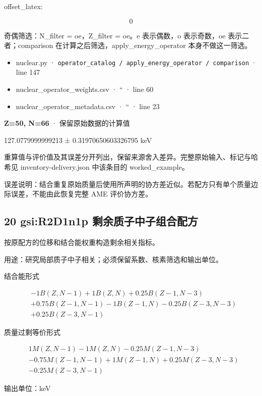 \documentclass[
  11pt,
  letterpaper,
]{article}
\providecommand{\tightlist}{%
  \setlength{\itemsep}{0pt}\setlength{\parskip}{0pt}}
\begin{document}
offset\_latex:

\[
0
\]

奇偶筛选：N\_filter = oe，Z\_filter = oe。e 表示偶数，o 表示奇数，oe
表示二者；comparison 在计算之后筛选，apply\_energy\_operator
本身不做这一筛选。

\begin{itemize}
\tightlist
\item
  nuclear.py ·
  \texttt{operator\_catalog\ /\ apply\_energy\_operator\ /\ comparison}
  · line 147
\item
  nuclear\_operator\_weights.csv · `` · line 60
\item
  nuclear\_operator\_metadata.csv · `` · line 23
\end{itemize}

\textbf{Z=50, N=66} · 保留原始数据的计算值

127.0779999999213 ± 0.31970650603326795 keV

重算值与评价值及其误差分开列出，保留来源舍入差异。完整原始输入、标记与哈希见
inventory-delivery.json 中该条目的 worked\_example。

误差说明：结合重复原始质量后使用所声明的协方差近似。若配方只有单个质量边际误差，不能由此恢复完整
AME 评价协方差。

\subsection{20 gsi:R2D1n1p
剩余质子中子组合配方}\label{gsir2d1n1p-ux5269ux4f59ux8d28ux5b50ux4e2dux5b50ux7ec4ux5408ux914dux65b9}

按原配方的位移和结合能权重构造剩余相关指标。

用途：研究局部质子中子相关；必须保留系数、核素筛选和输出单位。

结合能形式

\[
\begin{aligned}
& -1B(Z,N-1)+1B(Z,N)+0.25B(Z-1,N-3) \\
& +0.75B(Z-1,N-1)-1B(Z-1,N)-0.25B(Z-3,N-3) \\
& +0.25B(Z-3,N-1)
\end{aligned}
\]

质量过剩等价形式

\[
\begin{aligned}
& 1M(Z,N-1)-1M(Z,N)-0.25M(Z-1,N-3) \\
& -0.75M(Z-1,N-1)+1M(Z-1,N)+0.25M(Z-3,N-3) \\
& -0.25M(Z-3,N-1)
\end{aligned}
\]

输出单位：keV
\end{document}
